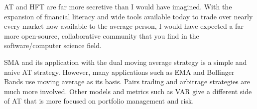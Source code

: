 \documentclass[letterpaper,11pt]{article}
\begin{document}
AT and HFT are far more secretive than I would have imagined. With the expansion of financial literacy and wide tools available today to trade over nearly every market now available to the average person, I would have expected a far more open-source, collaborative community that you find in the software/computer science field. 

SMA and its application with the dual moving average strategy is a simple and naive AT strategy. However, many applications such as EMA and Bollinger Bands use moving average as its basis. Pairs trading and arbitrage strategies are much more involved. Other models and metrics such as VAR give a different side of AT that is more focused on portfolio management and risk.


\nocite{*}

\end{document}
